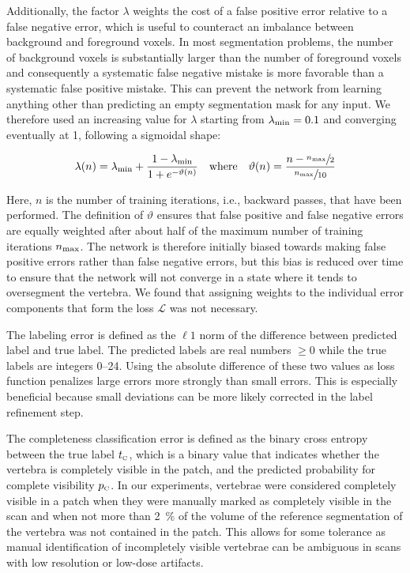 \documentclass[authoryear,5p,final,times]{elsarticle}
\begin{document}
    Additionally, the factor $\lambda$ weights the cost of a false positive error relative to a false negative error, which is useful to counteract an imbalance between background and foreground voxels. In most segmentation problems, the number of background voxels is substantially larger than the number of foreground voxels and consequently a systematic false negative mistake is more favorable than a systematic false positive mistake. This can prevent the network from learning anything other than predicting an empty segmentation mask for any input. We therefore used an increasing value for $\lambda$ starting from $\lambda_{\textnormal{min}} = 0.1$ and converging eventually at 1, following a sigmoidal shape:
    
    \begin{equation*}
        \lambda(n) =
            \lambda_{\textnormal{min}} +
            \frac{
                1 - \lambda_{\textnormal{min}}
            }{
                1 + e^{-\vartheta(n)}
            }
            \quad
            \textnormal{where}
            \quad
            \vartheta(n) = \frac{
                n - \sfrac{n_{\textnormal{max}}}{2}
            }{
                \sfrac{n_{\textnormal{max}}}{10}
            }
    \end{equation*}
    
    \noindent
    Here, $n$ is the number of training iterations, i.e., backward passes, that have been performed. The definition of $\vartheta$ ensures that false positive and false negative errors are equally weighted after about half of the maximum number of training iterations $n_{\textnormal{max}}$. The network is therefore initially biased towards making false positive errors rather than false negative errors, but this bias is reduced over time to ensure that the network will not converge in a state where it tends to oversegment the vertebra. We found that assigning weights to the individual error components that form the loss $\mathcal{L}$ was not necessary.
    
    The labeling error is defined as the $\ell 1$ norm of the difference between predicted label and true label. The predicted labels are real numbers $\geq 0$ while the true labels are integers \numrange{0}{24}. Using the absolute difference of these two values as loss function penalizes large errors more strongly than small errors. This is especially beneficial because small deviations can be more likely corrected in the label refinement step.
    
    The completeness classification error is defined as the binary cross entropy between the true label $t_\textnormal{\tiny C}$, which is a binary value that indicates whether the vertebra is completely visible in the patch, and the predicted probability for complete visibility $p_\textnormal{\tiny C}$. In our experiments, vertebrae were considered completely visible in a patch when they were manually marked as completely visible in the scan and when not more than \SI{2}{\percent} of the volume of the reference segmentation of the vertebra was not contained in the patch. This allows for some tolerance as manual identification of incompletely visible vertebrae can be ambiguous in scans with low resolution or low-dose artifacts.
    
\end{document}
